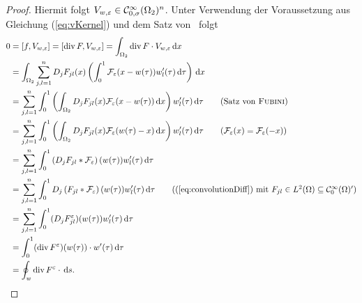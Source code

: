\begin{proof}
  Hiermit folgt $V_{w,\varepsilon} \in \mathcal{C}_{0,\sigma}^\infty(\Omega_2)^n$.
  Unter Verwendung der Voraussetzung aus Gleichung (\ref{eq:vKernel}) und dem Satz von \fubini\ folgt
  \begingroup
  \addtolength{\jot}{1em}
  \begin{align*}
    0
    &= [f, V_{w, \varepsilon}] %
    = [\div F, V_{w, \varepsilon}] %
    = \int_{\Omega_2} \div F \cdot V_{w, \varepsilon} \d x \\
    &= \int_{\Omega_2} \sum_{j,l=1}^n D_j F_{jl}(x) \left( \int_0^1 \mathcal{F}_\varepsilon(x - w(\tau))w_l'(\tau) \d\tau \right) \d x \\
    &= \sum_{j,l=1}^n \int_0^1 \left(\int_{\Omega_2}  D_j F_{jl}(x) \mathcal{F}_\varepsilon(x - w(\tau))\d x \right) w_l'(\tau) \d\tau \tag{Satz von \fubini}\\
    &= \sum_{j,l=1}^n \int_0^1 \left(\int_{\Omega_2}  D_j F_{jl}(x) \mathcal{F}_\varepsilon(w(\tau) - x)\d x \right) w_l'(\tau) \d\tau \tag{$\mathcal{F}_\varepsilon(x) = \mathcal{F}_\varepsilon(-x)$}\\
    &= \sum_{j,l=1}^n \int_0^1 \left(D_j F_{jl} \ast \mathcal{F}_\varepsilon\right)(w(\tau)) w_l'(\tau) \d\tau \\
    &= \sum_{j,l=1}^n \int_0^1 D_j\left(F_{jl} \ast \mathcal{F}_\varepsilon\right)(w(\tau)) w_l'(\tau) \d\tau \tag{(\ref{eq:convolutionDiff}) mit $F_{jl} \in L^2(\Omega) \subseteq \C_0^\infty(\Omega)'$}\\
    &= \sum_{j,l=1}^n \int_0^1 (D_j F_{jl}^\varepsilon)(w(\tau)) w_l'(\tau) \d\tau \\
    &= \int_0^1 (\div F^\varepsilon)(w(\tau)) \cdot w'(\tau) \d\tau \\
    &= \oint_w \div F^\varepsilon \cdot \d s.
  \end{align*}
  \endgroup


\end{proof}
